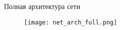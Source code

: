 
\begin{frame}{Полная архитектура сети}
\begin{figure}
\centering
\texttt{[image: net\_arch\_full.png]}
\end{figure}
\end{frame}